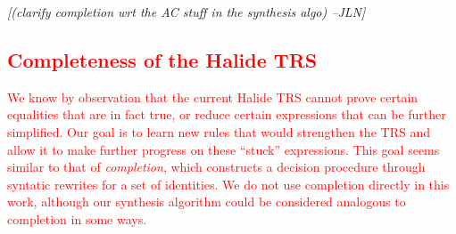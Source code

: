 \documentclass[acmsmall,review]{acmart}\settopmatter{printfolios=true,printccs=false,printacmref=false}
\newcommand{\jln}[1]{\textcolor{uwpurple}{\textit{[{#1} --JLN]}}}
\newcommand{\modified}[1]{\textcolor{red}{{#1}}}
\begin{document}







\jln{(clarify completion wrt the AC stuff in the synthesis algo)}

\subsection{\modified{Completeness of the Halide TRS}}
\label{sec:completion}

\modified{We know by observation that the current Halide TRS cannot prove certain equalities 
that are in fact true, or reduce certain expressions that can be further simplified. 
Our goal is to learn new rules that would strengthen the TRS and allow it to make
further progress on these ``stuck'' expressions. This goal seems similar to that of 
\emph{completion}, which constructs a decision procedure through syntatic rewrites
for a set of identities. We do not use completion directly in this work, although
our synthesis algorithm could be considered analogous to completion in some ways.}
\end{document}
